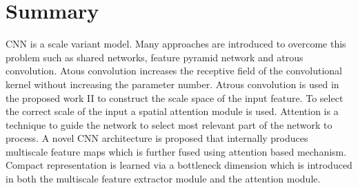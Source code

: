 \section{Summary}

CNN is a scale variant model. Many approaches are introduced to overcome this problem such as shared networks, feature pyramid network and atrous convolution. Atous convolution increases the receptive field of the convolutional kernel without increasing the parameter number. Atrous convolution is used in the proposed work II to construct the scale space of the input feature. To select the correct scale of the input a spatial attention module is used. Attention is a technique to guide the network to select most relevant part of the network to process. A novel CNN architecture is proposed that internally produces multiscale feature maps which is further fused using attention based mechanism. Compact representation is learned via a bottleneck dimension which is introduced in both the multiscale feature extractor module and the attention module.

